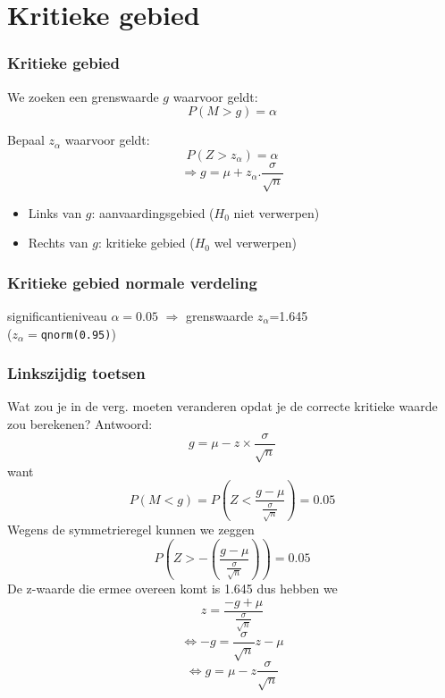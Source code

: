 \documentclass{beamer}
\begin{document}
\section{Kritieke gebied}
\sectionframelogo{}

\begin{frame}
  \frametitle{Kritieke gebied}
  
  
  We zoeken een grenswaarde $g$ waarvoor geldt:
  \[ P(M > g) = \alpha \]

  Bepaal $z_\alpha$ waarvoor geldt:
  \[ P(Z > z_\alpha) = \alpha \]
  \[ \Rightarrow g = \mu + z_\alpha . \frac{\sigma}{\sqrt{n}} \]
  
  \begin{itemize}
    \item Links van $g$: aanvaardingsgebied ($H_0$ niet verwerpen)
    \item Rechts van $g$: kritieke gebied ($H_0$ wel verwerpen)
  \end{itemize}
  
\end{frame}


\begin{frame}
  \frametitle{Kritieke gebied normale verdeling}

  \centering

significantieniveau $\alpha = 0.05$ $\Rightarrow$ grenswaarde $z_{\alpha}$=1.645\\
($z_{\alpha} = $\texttt{qnorm(0.95)})
  
\end{frame}

\begin{frame}
  \frametitle{Linkszijdig toetsen}
    Wat zou je in de verg.  moeten veranderen opdat je de correcte kritieke waarde zou berekenen?
    \pause
    Antwoord:
 \[g = \mu - z \times \frac{\sigma}{\sqrt{n}} \]
want
\[ P(M < g) = P\left(Z < \frac{g - \mu}{\frac{\sigma}{\sqrt{n}}}\right) = 0.05 \]
Wegens de symmetrieregel kunnen we zeggen
\[ P\left(Z > - \left( \frac{g - \mu}{\frac{\sigma}{\sqrt{n}}} \right) \right) = 0.05 \]
De z-waarde die ermee overeen komt is 1.645 dus hebben we
\[ z = \frac{-g + \mu}{\frac{\sigma}{\sqrt{n}}} \]
\[ \Leftrightarrow -g = \frac{\sigma}{\sqrt{n}} z - \mu \]
\[ \Leftrightarrow g = \mu - z \frac{\sigma}{\sqrt{n}} \]
\end{frame}
\end{document}
